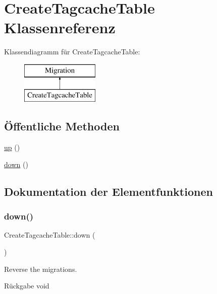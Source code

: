 \hypertarget{classCreateTagcacheTable}{}\section{Create\+Tagcache\+Table Klassenreferenz}
\label{classCreateTagcacheTable}
Klassendiagramm für Create\+Tagcache\+Table\+:\begin{figure}[H]
\begin{center}
\leavevmode
\includegraphics[height=2.000000cm]{d2/d6c/classCreateTagcacheTable}
\end{center}
\end{figure}
\subsection*{Öffentliche Methoden}
\begin{DoxyCompactItemize}
\item 
\hyperlink{classCreateTagcacheTable_a115a9b6f95e1cacc5af55ad59f2c7c79}{up} ()
\item 
\hyperlink{classCreateTagcacheTable_a2dd775eac01690572725789e047239ed}{down} ()
\end{DoxyCompactItemize}


\subsection{Dokumentation der Elementfunktionen}
\mbox{\label{classCreateTagcacheTable_a2dd775eac01690572725789e047239ed}} 
\subsubsection{\texorpdfstring{down()}{down()}}
{\footnotesize\ttfamily Create\+Tagcache\+Table\+::down (\begin{DoxyParamCaption}{ }\end{DoxyParamCaption})}

Reverse the migrations.

\begin{DoxyReturn}{Rückgabe}
void 
\end{DoxyReturn}
\mbox{\label{classCreateTagcacheTable_a115a9b6f95e1cacc5af55ad59f2c7c79}} 
